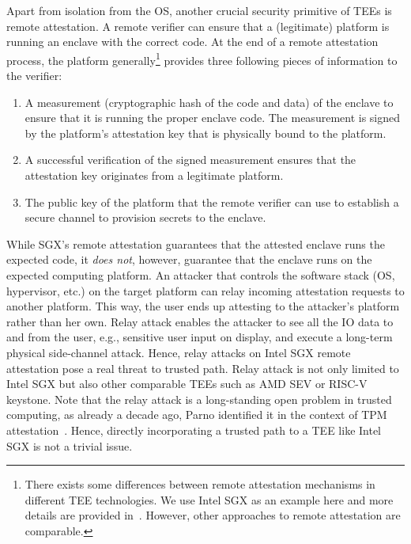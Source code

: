  Apart from isolation from the OS, another crucial security primitive of TEEs is remote attestation. A remote verifier can ensure that a (legitimate) platform is running an enclave with the correct code. At the end of a remote attestation process, the platform generally\footnote{There exists some differences between remote attestation mechanisms in different TEE technologies. We use Intel SGX as an example here and more details are provided in~. However, other approaches to remote attestation are comparable.} provides three following pieces of information to the verifier: 
\begin {enumerate}
\item A measurement (cryptographic hash of the code and data) of the enclave to ensure that it is running the proper enclave code. The measurement is signed by the platform's attestation key that is physically bound to the platform. 
\item A successful verification of the signed measurement ensures that the attestation key originates from a legitimate platform.
\item The public key of the platform that the remote verifier can use to establish a secure channel to provision secrets to the enclave.
\end{enumerate}

 While SGX's remote attestation guarantees that the attested enclave runs the expected code, it \emph{does not}, however, guarantee that the enclave runs on the expected computing platform. An attacker that controls the software stack (OS, hypervisor, etc.) on the target platform can relay incoming attestation requests to another platform. This way, the user ends up attesting to the attacker's platform rather than her own. Relay attack enables the attacker to see all the IO data to and from the user, e.g., sensitive user input on display, and execute a long-term physical side-channel attack. Hence, relay attacks on Intel SGX remote attestation pose a real threat to trusted path. Relay attack is not only limited to Intel SGX but also other comparable TEEs such as AMD SEV or RISC-V keystone. Note that the relay attack is a long-standing open problem in trusted computing, as already a decade ago, Parno identified it in the context of TPM attestation~\cite{parno2008bootstrapping}. Hence, directly incorporating a trusted path to a TEE like Intel SGX is not a trivial issue.


